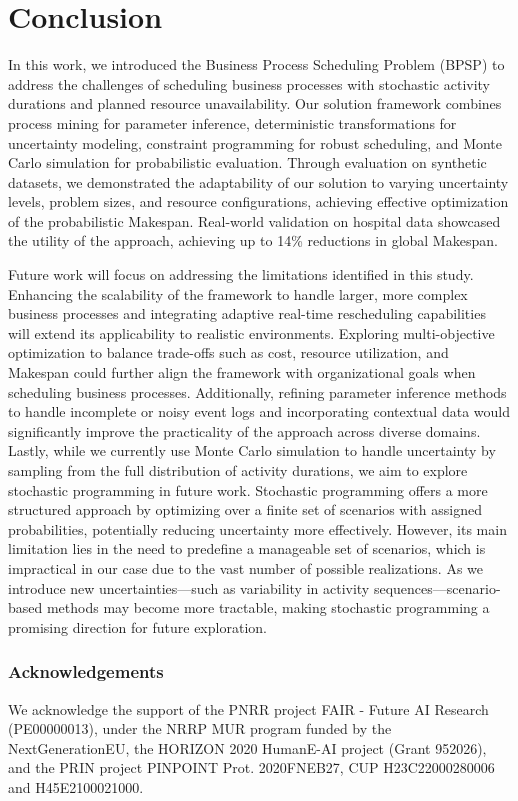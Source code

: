 \section{Conclusion}
\label{sec:conclusion}

In this work, we introduced the Business Process Scheduling Problem (BPSP) to address the challenges of scheduling business processes with stochastic activity durations and planned resource unavailability. Our solution framework combines process mining for parameter inference, deterministic transformations for uncertainty modeling, constraint programming for robust scheduling, and Monte Carlo simulation for probabilistic evaluation. Through evaluation on synthetic datasets, we demonstrated the adaptability of our solution to varying uncertainty levels, problem sizes, and resource configurations, achieving effective optimization of the probabilistic Makespan. Real-world validation on hospital data showcased the utility of the approach, achieving up to 14\% reductions in global Makespan.

Future work will focus on addressing the limitations identified in this study. Enhancing the scalability of the framework to handle larger, more complex business processes and integrating adaptive real-time rescheduling capabilities will extend its applicability to realistic environments. Exploring multi-objective optimization to balance trade-offs such as cost, resource utilization, and Makespan could further align the framework with organizational goals when scheduling business processes. Additionally, refining parameter inference methods to handle incomplete or noisy event logs and incorporating contextual data would significantly improve the practicality of the approach across diverse domains.
Lastly, while we currently use Monte Carlo simulation to handle uncertainty by sampling from the full distribution of activity durations, we aim to explore stochastic programming in future work. Stochastic programming offers a more structured approach by optimizing over a finite set of scenarios with assigned probabilities, potentially reducing uncertainty more effectively. However, its main limitation lies in the need to predefine a manageable set of scenarios, which is impractical in our case due to the vast number of possible realizations. As we introduce new uncertainties—such as variability in activity sequences—scenario-based methods may become more tractable, making stochastic programming a promising direction for future exploration.


\subsubsection{Acknowledgements}
We acknowledge the support of the PNRR project FAIR - Future AI Research (PE00000013), under the NRRP MUR program funded by the NextGenerationEU, the HORIZON 2020 HumanE-AI project (Grant 952026), and the PRIN project PINPOINT Prot. 2020FNEB27, CUP H23C22000280006 and H45E2100021000. 